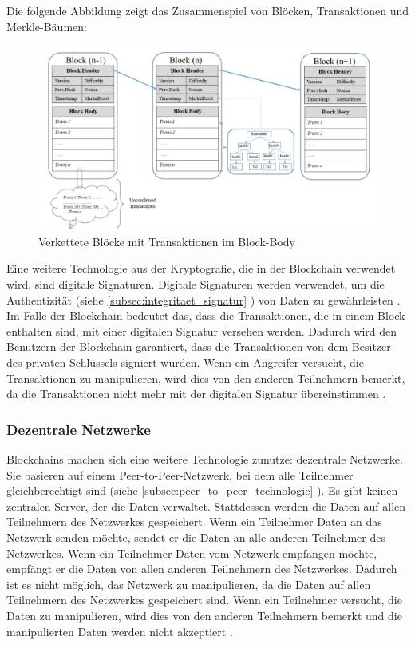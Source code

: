 Die folgende Abbildung zeigt das Zusammenspiel von Blöcken, Transaktionen und Merkle-Bäumen:

\begin{figure}[H]
    \centering
    \includegraphics[width=1\linewidth]{images/chain_of_blocks_with_merkle_tree.png}
    \caption{Verkettete Blöcke mit Transaktionen im Block-Body \parencite[S. 95035]{Nam_51PercentAttacks}}
    \label{fig:chain_of_blocks_with_merkle_tree}
\end{figure}


\noindent Eine weitere Technologie aus der Kryptografie, die in der Blockchain verwendet wird, sind digitale Signaturen. Digitale Signaturen werden verwendet, um die Authentizität (siehe \ref{subsec:integritaet_signatur} \textit{}) von Daten zu gewährleisten \parencite[S. 9-10]{Fill_BlockchainGrundlagen}. Im Falle der Blockchain bedeutet das, dass die Transaktionen, die in einem Block enthalten sind, mit einer digitalen Signatur versehen werden. Dadurch wird den Benutzern der Blockchain garantiert, dass die Transaktionen von dem Besitzer des privaten Schlüssels signiert wurden. Wenn ein Angreifer versucht, die Transaktionen zu manipulieren, wird dies von den anderen Teilnehmern bemerkt, da die Transaktionen nicht mehr mit der digitalen Signatur übereinstimmen \parencite[S. 10]{Fill_BlockchainGrundlagen}.


\subsubsection{Dezentrale Netzwerke}

Blockchains machen sich eine weitere Technologie zunutze: dezentrale Netzwerke. Sie basieren auf einem Peer-to-Peer-Netzwerk, bei dem alle Teilnehmer gleichberechtigt sind (siehe \ref{subsec:peer_to_peer_technologie} \textit{}). Es gibt keinen zentralen Server, der die Daten verwaltet. Stattdessen werden die Daten auf allen Teilnehmern des Netzwerkes gespeichert. Wenn ein Teilnehmer Daten an das Netzwerk senden möchte, sendet er die Daten an alle anderen Teilnehmer des Netzwerkes. Wenn ein Teilnehmer Daten vom Netzwerk empfangen möchte, empfängt er die Daten von allen anderen Teilnehmern des Netzwerkes. Dadurch ist es nicht möglich, das Netzwerk zu manipulieren, da die Daten auf allen Teilnehmern des Netzwerkes gespeichert sind. Wenn ein Teilnehmer versucht, die Daten zu manipulieren, wird dies von den anderen Teilnehmern bemerkt und die manipulierten Daten werden nicht akzeptiert \parencite[S. 10/31]{Fill_BlockchainGrundlagen}.


